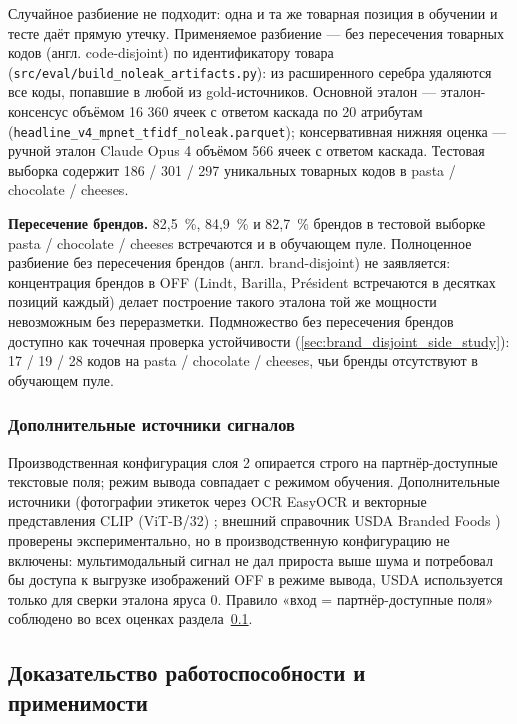 Случайное разбиение не подходит: одна и та же товарная позиция в обучении и тесте даёт прямую утечку. Применяемое разбиение — без пересечения товарных кодов (англ. code-disjoint) по идентификатору товара (\texttt{src/eval/build\_noleak\_artifacts.py}): из расширенного серебра удаляются все коды, попавшие в любой из gold-источников. Основной эталон — эталон-консенсус объёмом 16 360 ячеек с ответом каскада по 20 атрибутам (\texttt{headline\_v4\_mpnet\_tfidf\_noleak.parquet}); консервативная нижняя оценка — ручной эталон Claude Opus 4 объёмом 566 ячеек с ответом каскада. Тестовая выборка содержит 186 / 301 / 297 уникальных товарных кодов в pasta / chocolate / cheeses.

\textbf{Пересечение брендов.} 82,5~\%, 84,9~\% и 82,7~\% брендов в тестовой выборке pasta / chocolate / cheeses встречаются и в обучающем пуле. Полноценное разбиение без пересечения брендов (англ. brand-disjoint) не заявляется: концентрация брендов в OFF (Lindt, Barilla, Président встречаются в десятках позиций каждый) делает построение такого эталона той же мощности невозможным без переразметки. Подмножество без пересечения брендов доступно как точечная проверка устойчивости (\ref{sec:brand_disjoint_side_study}): 17 / 19 / 28 кодов на pasta / chocolate / cheeses, чьи бренды отсутствуют в обучающем пуле.

\subsubsection{Дополнительные источники сигналов}
\label{subsubsec:extra_signals}

Производственная конфигурация слоя 2 опирается строго на партнёр-доступные текстовые поля; режим вывода совпадает с режимом обучения. Дополнительные источники (фотографии этикеток через OCR EasyOCR и векторные представления CLIP (ViT-B/32) \cite{ref_43}; внешний справочник USDA Branded Foods \cite{ref_44}) проверены экспериментально, но в производственную конфигурацию не включены: мультимодальный сигнал не дал прироста выше шума и потребовал бы доступа к выгрузке изображений OFF в режиме вывода, USDA используется только для сверки эталона яруса 0. Правило «вход = партнёр-доступные поля» соблюдено во всех оценках раздела~\ref{subsec:proof}.

\subsection{Доказательство работоспособности и применимости}
\label{subsec:proof}

